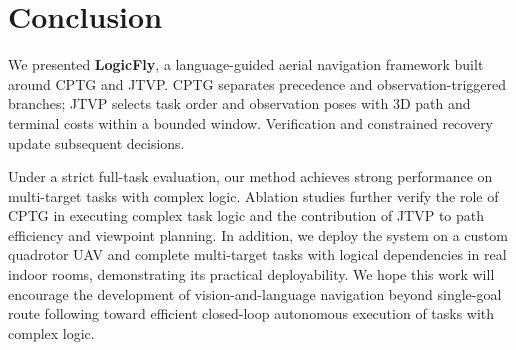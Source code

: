 \documentclass[letterpaper,10pt,conference]{ieeeconf}
\begin{document}
\section{Conclusion}
We presented \textbf{LogicFly}, a language-guided aerial navigation framework built around CPTG and JTVP. CPTG separates precedence and observation-triggered branches; JTVP selects task order and observation poses with 3D path and terminal costs within a bounded window. Verification and constrained recovery update subsequent decisions.

Under a strict full-task evaluation, our method achieves strong performance on multi-target tasks with complex logic. Ablation studies further verify the role of CPTG in executing complex task logic and the contribution of JTVP to path efficiency and viewpoint planning. In addition, we deploy the system on a custom quadrotor UAV and complete multi-target tasks with logical dependencies in real indoor rooms, demonstrating its practical deployability. We hope this work will encourage the development of vision-and-language navigation beyond single-goal route following toward efficient closed-loop autonomous execution of tasks with complex logic.
\balance


\end{document}
